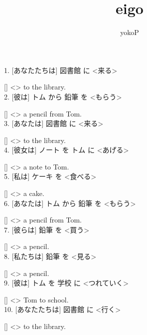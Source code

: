 \documentclass[uplatex,
paper=a4,
fontsize=18pt,
jafontsize=16pt,
number_of_lines=30,
line_length=30zh,
baselineskip=25pt,
]{jlreq}
\author{yokoP}
\title{eigo}
\begin{document}
1.  [あなたたちは] 図書館 に <来る>

  [\hspace{3em}] <\hspace{3em}> to the library.
\\

2.  [彼は] トム から 鉛筆 を <もらう>

  [\hspace{3em}] <\hspace{3em}> a pencil from Tom.
\\

3.  [あなたは] 図書館 に <来る>

  [\hspace{3em}] <\hspace{3em}> to the library.
\\

4.  [彼女は] ノート を トム に <あげる>

  [\hspace{3em}] <\hspace{3em}> a note to Tom.
\\

5.  [私は] ケーキ を <食べる>

  [\hspace{3em}] <\hspace{3em}> a cake.
\\

6.  [あなたは] トム から 鉛筆 を <もらう>

  [\hspace{3em}] <\hspace{3em}> a pencil from Tom.
\\

7.  [彼らは] 鉛筆 を <買う>

  [\hspace{3em}] <\hspace{3em}> a pencil.
\\

8.  [私たちは] 鉛筆 を <見る>

  [\hspace{3em}] <\hspace{3em}> a pencil.
\\

9.  [彼は] トム を 学校 に <つれていく>

  [\hspace{3em}] <\hspace{3em}> Tom to school.
\\

10.  [あなたたちは] 図書館 に <行く>

  [\hspace{3em}] <\hspace{3em}> to the library.
\\
\end{document}

